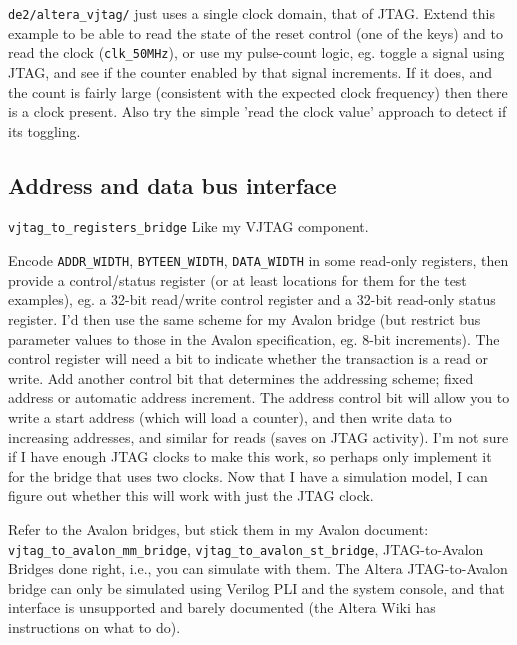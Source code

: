 \documentclass[10pt,twoside]{article}
\begin{document}
\verb+de2/altera_vjtag/+ just uses a single clock domain,
that of JTAG. Extend this example to be able to read the state
of the reset control (one of the keys) and to read the clock
(\verb+clk_50MHz+), or use my pulse-count logic, eg. toggle a signal
using JTAG, and see if the counter enabled by that signal
increments. If it does, and the count is fairly large
(consistent with the expected clock frequency) then there is a
clock present. Also try the simple 'read the clock value'
approach to detect if its toggling.

\subsection{Address and data bus interface}

\verb+vjtag_to_registers_bridge+ Like my VJTAG component.

Encode \verb+ADDR_WIDTH+, \verb+BYTEEN_WIDTH+,
\verb+DATA_WIDTH+ in some read-only registers, then provide a
control/status register (or at least locations for them for
the test examples), eg. a 32-bit read/write control register
and a 32-bit read-only status register. I'd then use the
same scheme for my Avalon bridge (but restrict bus parameter
values to those in the Avalon specification, eg. 8-bit increments).
The control register will need a bit to indicate whether the
transaction is a read or write. Add another control bit that
determines the addressing scheme; fixed address or automatic address
increment. The address control bit will allow you to write a start
address (which will load a counter), and then write data
to increasing addresses, and similar for reads (saves on
JTAG activity). I'm not sure if I have enough JTAG clocks
to make this work, so perhaps only implement it for the
bridge that uses two clocks. Now that I have a simulation
model, I can figure out whether this will work with just
the JTAG clock.

Refer to the Avalon bridges, but stick them in my Avalon document:
\verb+vjtag_to_avalon_mm_bridge+,
\verb+vjtag_to_avalon_st_bridge+,
JTAG-to-Avalon Bridges done right, i.e., you can simulate with them.
The Altera JTAG-to-Avalon bridge can only be simulated using
Verilog PLI and the system console, and that interface is
unsupported and barely documented (the Altera Wiki has instructions
on what to do).

\end{document}
